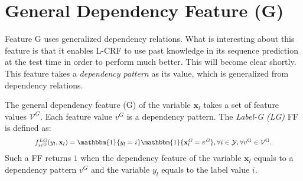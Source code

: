 \documentclass[11pt,a4paper]{article}
\theoremstyle{definition}
\begin{document}
\section{General Dependency Feature (G)}
Feature G uses generalized dependency relations. What is interesting about this feature is that it enables L-CRF to use past knowledge in its sequence prediction at the test time in order to perform much better. This will become clear shortly. 
This feature 
takes a \emph{dependency pattern} as its value, which is generalized from dependency relations.

The general dependency feature (G) of the variable $\mathbf{x}_l$ takes a set of feature values $\mathcal{V}^{\textit{G}}$. Each feature value $v^{\textit{G}}$ is a dependency pattern. The \emph{Label-G (LG)} FF is defined as:
    \begin{equation}
    \label{lg feature function}
    \resizebox{0.85\hsize}{!}{
        $f_{iv^{\text{G}}}^{\textit{LG}}(y_l,\mathbf{x}_l) = \mathbbm{1}\{y_l=i\}\mathbbm{1}\{\mathbf{x}_l^{\textit{G}}=v^{\textit{G}}\} ,\forall i \in \mathcal{Y}, 
        \forall v^{\text{G}}\in \mathcal{V}^{\text{G}}.$
    }
    \end{equation}
Such a FF returns $1$ when the dependency feature of the variable $\mathbf{x}_l$ equals to a dependency pattern $v^{\textit{G}}$ and the variable $y_l$ equals to the label value $i$.



\end{document}
